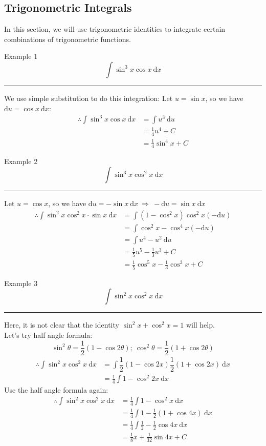 \documentclass[12pt,a4paper]{article}
\def\d{{\mathrm{d}}}
\begin{document}
\subsection{Trigonometric Integrals}
In this section, we will use trigonometric identities to integrate certain combinations of trigonometric functions. 
\begin{eg}{Example 1}
	$$\int\sin^3x\cos{x}\ \d x$$
	\noindent\rule[0.25\baselineskip]{\textwidth}{1pt}
	We use simple substitution to do this integration: Let $u=\sin{x}$, so we have $\d u=\cos{x}\ \d x$: 
	$$\begin{aligned}
		\therefore\int\sin^3x\cos{x}\ \d x&=\int u^3\ \d u\\
		&=\frac{1}{4}u^4+C\\
		&=\frac{1}{4}\sin^4x+C
	\end{aligned}$$
\end{eg}
\begin{eg}{Example 2}
	$$\int\sin^3x\cos^2x\ \d x$$
	\noindent\rule[0.25\baselineskip]{\textwidth}{1pt}
	Let $u=\cos{x}$, so we have $\d u=-\sin{x}\ \d x \ \Rightarrow\ -\d u=\sin{x}\ \d x$
	$$\begin{aligned}
		\therefore\int\sin^2x\cos^2x\cdot\sin{x}\ \d x&=\int\left(1-\cos^2x\right)\cos^2x(-\d u)\\
		&=\int\cos^2x-\cos^4x(-\d u)\\
		&=\int u^4-u^2\ \d u\\
		&=\frac{1}{5}u^5-\frac{1}{3}u^3+C\\
		&=\frac{1}{5}\cos^5x-\frac{1}{3}\cos^3x+C
	\end{aligned}$$
\end{eg}
\begin{eg}{Example 3}
	$$\int\sin^2x\cos^2x\ \d x$$
	\noindent\rule[0.25\baselineskip]{\textwidth}{1pt}
	Here, it is not clear that the identity $\sin^2x+\cos^2x=1$ will help. \\
	Let's try half angle formula: $$\sin^2\theta=\dfrac{1}{2}(1-\cos{2\theta});\ \cos^2\theta=\dfrac{1}{2}(1+\cos{2\theta})$$
	$$\begin{aligned}
		\therefore\int\sin^2x\cos^2x\ \d x&=\int\dfrac{1}{2}(1-\cos{2x})\dfrac{1}{2}(1+\cos{2x})\ \d x\\
		&=\frac{1}{4}\int 1-\cos^2{2x}\ \d x
	\end{aligned}$$
	Use the half angle formula again: 
	$$\begin{aligned}
		\therefore\int\sin^2x\cos^2x\ \d x&=\frac{1}{4}\int 1-\cos^2x\ \d x\\
		&=\frac{1}{4}\int 1-\frac{1}{2}(1+\cos{4x})\ \d x\\
		&=\frac{1}{4}\int \frac{1}{2}-\frac{1}{2}\cos{4x}\ \d x\\
		&=\frac{1}{8}x+\frac{1}{32}\sin{4x}+C
	\end{aligned}$$
\end{eg}
\end{document}
